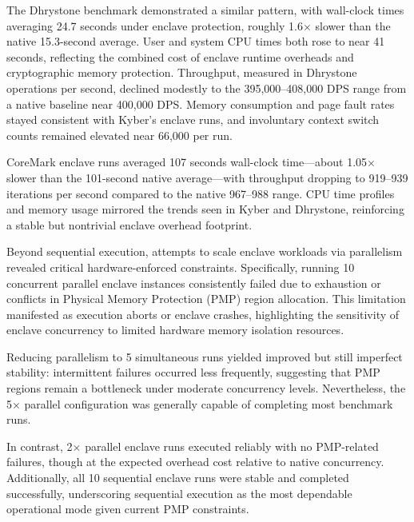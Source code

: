 The Dhrystone benchmark demonstrated a similar pattern, with wall-clock times averaging 24.7 seconds under enclave protection, roughly 1.6$\times$ slower than the native 15.3-second average. User and system CPU times both rose to near 41 seconds, reflecting the combined cost of enclave runtime overheads and cryptographic memory protection. Throughput, measured in Dhrystone operations per second, declined modestly to the 395,000--408,000 DPS range from a native baseline near 400,000 DPS. Memory consumption and page fault rates stayed consistent with Kyber’s enclave runs, and involuntary context switch counts remained elevated near 66,000 per run.


CoreMark enclave runs averaged 107 seconds wall-clock time—about 1.05$\times$ slower than the 101-second native average—with throughput dropping to 919--939 iterations per second compared to the native 967--988 range. CPU time profiles and memory usage mirrored the trends seen in Kyber and Dhrystone, reinforcing a stable but nontrivial enclave overhead footprint.

Beyond sequential execution, attempts to scale enclave workloads via parallelism revealed critical hardware-enforced constraints. Specifically, running 10 concurrent parallel enclave instances consistently failed due to exhaustion or conflicts in Physical Memory Protection (PMP) region allocation. This limitation manifested as execution aborts or enclave crashes, highlighting the sensitivity of enclave concurrency to limited hardware memory isolation resources.

Reducing parallelism to 5 simultaneous runs yielded improved but still imperfect stability: intermittent failures occurred less frequently, suggesting that PMP regions remain a bottleneck under moderate concurrency levels. Nevertheless, the 5$\times$ parallel configuration was generally capable of completing most benchmark runs.

In contrast, 2$\times$ parallel enclave runs executed reliably with no PMP-related failures, though at the expected overhead cost relative to native concurrency. Additionally, all 10 sequential enclave runs were stable and completed successfully, underscoring sequential execution as the most dependable operational mode given current PMP constraints.

